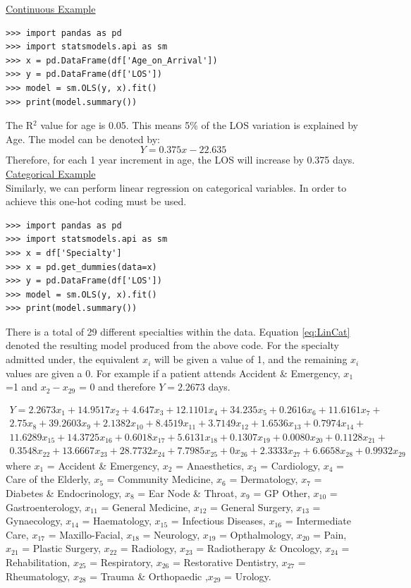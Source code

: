 \documentclass[../thesis.tex]{subfiles}
\begin{document}
\underline{Continuous Example}
\begin{lstlisting}[style=pystyle]
>>> import pandas as pd
>>> import statsmodels.api as sm
>>> x = pd.DataFrame(df['Age_on_Arrival']) 
>>> y = pd.DataFrame(df['LOS'])
>>> model = sm.OLS(y, x).fit()
>>> print(model.summary())
\end{lstlisting}


The R$^2$ value for age is 0.05. This means 5\% of the LOS variation is explained by Age. The model can be denoted by: 
\begin{equation}
    Y = 0.375x - 22.635
\end{equation}
Therefore, for each 1 year increment in age, the LOS will increase by 0.375 days.
\underline{Categorical Example}\\
Similarly, we can perform linear regression on categorical variables. In order to achieve this one-hot coding must be used.
\begin{lstlisting}[style=pystyle]
>>> import pandas as pd
>>> import statsmodels.api as sm
>>> x = df['Specialty']
>>> x = pd.get_dummies(data=x)
>>> y = pd.DataFrame(df['LOS'])
>>> model = sm.OLS(y, x).fit()
>>> print(model.summary())
\end{lstlisting}
There is a total of 29 different specialties within the data. Equation \ref{eq:LinCat} denoted the resulting model produced from the above code. For the specialty admitted under, the equivalent $x_i$ will be given a value of 1, and the remaining $x_i$ values are given a 0. For example if a patient attends Accident \& Emergency, $x_1$ =1 and $x_2 - x_29$ = 0 and therefore $Y=2.2673$ days.

\begin{multline}\label{eq:Lincat}
    Y = 2.2673x_1 + 14.9517x_2 +4.647x_3 +12.1101x_4 + 34.235x_5 +0.2616x_6 + 11.6161x_7+\\ 
    2.75x_8 +39.2603x_9 + 2.1382x_{10} +8.4519x_{11} + 3.7149x_{12} + 1.6536x_{13} + 0.7974x_{14} + \\
    11.6289x_{15} + 14.3725x_{16} + 0.6018x_{17} + 5.6131x_{18}+ 0.1307x_{19} + 0.0080x_{20} + 0.1128x_{21} + \\
    0.3548x_{22} + 13.6667x_{23} + 28.7732x_{24} + 7.7985x_{25} + 0x_{26} + 2.3333x_{27} + 6.6658x_{28} + 0.9932x_{29}
\end{multline}
where $x_{1}$ = Accident \& Emergency, $x_{2}$ = Anaesthetics, $x_{3}$ = Cardiology, $x_{4}$ = Care of the Elderly, $x_{5}$ = Community Medicine, $x_{6}$ = Dermatology, $x_{7}$ = Diabetes \& Endocrinology, $x_{8}$ = Ear Node \& Throat, $x_{9}$ = GP Other, $x_{10}$ = Gastroenterology, $x_{11}$ = General Medicine, $x_{12}$ = General Surgery, $x_{13}$ = Gynaecology, $x_{14}$ = Haematology, $x_{15}$ = Infectious Diseases, $x_{16}$ = Intermediate Care, $x_{17}$ = Maxillo-Facial, $x_{18}$ = Neurology, $x_{19}$ = Opthalmology, $x_{20}$ = Pain, $x_{21}$ = Plastic Surgery, $x_{22}$ = Radiology, $x_{23}$ = Radiotherapy \& Oncology, $x_{24}$ = Rehabilitation, $x_{25}$ = Respiratory, $x_{26}$ = Restorative Dentistry, $x_{27}$ = Rheumatology, $x_{28}$ = Trauma \& Orthopaedic ,$x_{29}$ = Urology.\\
\end{document}
